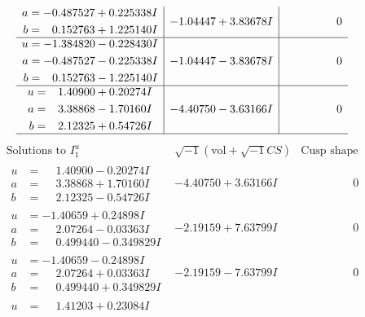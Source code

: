 \documentclass[1p]{elsarticle_modified}
\theoremstyle{definition}
\newcommand{\I}{\sqrt{-1}}
\begin{document}
$$\begin{array}{c|c|c}
\begin{aligned}
a &= -0.487527 + 0.225338 I \\
b &= \phantom{-}0.152763 + 1.225140 I\end{aligned}
 & -1.04447 + 3.83678 I & \phantom{-0.000000 } 0 \\ \hline\begin{aligned}
u &= -1.384820 - 0.228430 I \\
a &= -0.487527 - 0.225338 I \\
b &= \phantom{-}0.152763 - 1.225140 I\end{aligned}
 & -1.04447 - 3.83678 I & \phantom{-0.000000 } 0 \\ \hline\begin{aligned}
u &= \phantom{-}1.40900 + 0.20274 I \\
a &= \phantom{-}3.38868 - 1.70160 I \\
b &= \phantom{-}2.12325 + 0.54726 I\end{aligned}
 & -4.40750 - 3.63166 I & \phantom{-0.000000 } 0\\
 \hline 
 \end{array}$$\newpage$$\begin{array}{c|c|c}  
\text{Solutions to }I^u_{1}& \I (\text{vol} + \sqrt{-1}CS) & \text{Cusp shape}\\
 \hline 
\begin{aligned}
u &= \phantom{-}1.40900 - 0.20274 I \\
a &= \phantom{-}3.38868 + 1.70160 I \\
b &= \phantom{-}2.12325 - 0.54726 I\end{aligned}
 & -4.40750 + 3.63166 I & \phantom{-0.000000 } 0 \\ \hline\begin{aligned}
u &= -1.40659 + 0.24898 I \\
a &= \phantom{-}2.07264 - 0.03363 I \\
b &= \phantom{-}0.499440 - 0.349829 I\end{aligned}
 & -2.19159 + 7.63799 I & \phantom{-0.000000 } 0 \\ \hline\begin{aligned}
u &= -1.40659 - 0.24898 I \\
a &= \phantom{-}2.07264 + 0.03363 I \\
b &= \phantom{-}0.499440 + 0.349829 I\end{aligned}
 & -2.19159 - 7.63799 I & \phantom{-0.000000 } 0 \\ \hline\begin{aligned}
u &= \phantom{-}1.41203 + 0.23084 I \\

\end{aligned}
\end{array}$$
\end{document}
